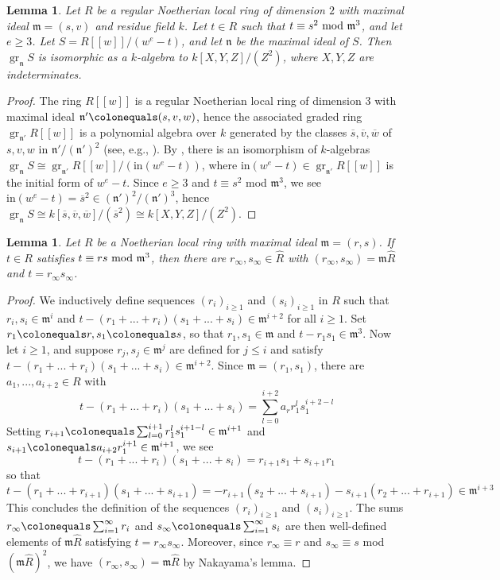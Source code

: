 \documentclass[12pt]{amsart}
\numberwithin{equation}{section}
\newtheorem{lemma}[equation]{Lemma}
\theoremstyle{definition}
\newcommand{\n}{\mathfrak{n}}
\renewcommand{\c}[1]{\overline{#1}}
\newcommand{\m}{\mathfrak{m}}
\newcommand{\tx}[1]{\text{#1}}
\DeclareMathOperator{\gr}{gr}
\begin{document}
\begin{lemma}\label{lemma: associated graded ring}
    Let $R$ be a regular Noetherian local ring of dimension $2$ with maximal ideal $\m=(s,v)$ and residue field $k$. Let $t\in R$ such that $t\equiv s^2\textup{ mod }\m^3$, and let $e\geq3$. Let $S=R[[w]]/(w^e-t)$, and let $\n$ be the maximal ideal of $S$. Then $\gr_\n S$ is isomorphic as a $k$-algebra to $k[X,Y,Z]/(Z^2)$, where $X,Y,Z$ are indeterminates.
\end{lemma}
\begin{proof}
    The ring $R[[w]]$ is a regular Noetherian local ring of dimension $3$ with maximal ideal $\n'\colonequals(s,v,w)$, hence the associated graded ring $\gr_{\n'}R[[w]]$ is a polynomial algebra over $k$ generated by the classes $\c{s},\c{v},\c{w}$ of $s,v,w$ in $\n'/(\n')^2$ (see, e.g., \cite[Tag 00NO]{stacks-project}). By \cite[Exercises 5.2 and 5.3]{Eis}, there is an isomorphism of $k$-algebras $\gr_\n S\cong\gr_{\n'}R[[w]]/(\tx{in}(w^e-t))$, where $\tx{in}(w^e-t)\in\gr_{\n'}R[[w]]$ is the initial form of $w^e-t$. Since $e\geq 3$ and $t\equiv s^2$ mod $\m^3$, we see $\tx{in}(w^e-t)=\c{s}^2\in(\n')^2/(\n')^3$, hence $\gr_\n S\cong k[\c{s},\c{v},\c{w}]/(\c{s}^2)\cong k[X,Y,Z]/(Z^2)$.
\end{proof}

\begin{lemma}\label{lemma: factorization in completion}
Let $R$ be a Noetherian local ring with maximal ideal $\m=(r,s)$. If $t\in R$ satisfies $t\equiv rs\textup{ mod }\m^3$, then there are $r_\infty,s_\infty\in\widehat{R}$ with $(r_\infty,s_\infty)=\m\widehat{R}$ and $t=r_\infty s_\infty$.
\end{lemma}
\begin{proof}
    We inductively define sequences $(r_i)_{i\geq1}$ and $(s_i)_{i\geq 1}$ in $R$ such that $r_i,s_i\in\m^i$ and  
    $t-(r_1+...+r_i)(s_1+...+s_i)\in \m^{i+2}$ for all $i\geq 1$.
    Set $r_1\colonequals r,s_1\colonequals s$, so that $r_1,s_1\in\m$ and $t-r_1s_1\in\m^3$. Now let $i\geq 1$, and suppose $r_j,s_j\in\m^j$ are defined for $j\leq i$ and satisfy
    $t-(r_1+...+r_i)(s_1+...+s_i)\in \m^{i+2}$. Since $\m=(r_1,s_1)$, there are $a_1,...,a_{i+2}\in R$ with
    \[t-(r_1+...+r_i)(s_1+...+s_i)=\sum_{l=0}^{i+2} a_rr_1^ls_1^{i+2-l}\]
    Setting $r_{i+1}\colonequals\sum_{l=0}^{i+1}r_1^ls_1^{i+1-l}\in\m^{i+1}$ and $s_{i+1}\colonequals a_{i+2}r_1^{i+1}\in\m^{i+1}$, we see \[t-(r_1+...+r_i)(s_1+...+s_i)=r_{i+1}s_1+s_{i+1}r_1\]
    so that \[t-(r_1+...+r_{i+1})(s_1+...+s_{i+1})=-r_{i+1}(s_2+...+s_{i+1})-s_{i+1}(r_2+...+r_{i+1})\in\m^{i+3}\]
    This concludes the definition of the sequences $(r_i)_{i\geq1}$ and $(s_i)_{i\geq 1}$. The sums $r_\infty\colonequals\sum_{i=1}^\infty r_i$ and $s_\infty\colonequals\sum_{i=1}^\infty s_i$
    are then well-defined elements of $\m\widehat{R}$ satisfying $t=r_\infty s_\infty$. Moreover, since $r_\infty\equiv r$ and $s_\infty\equiv s$ mod $(\m\widehat{R})^2$, we have $(r_\infty,s_\infty)=\m\widehat{R}$ by Nakayama's lemma.
\end{proof}
\end{document}
